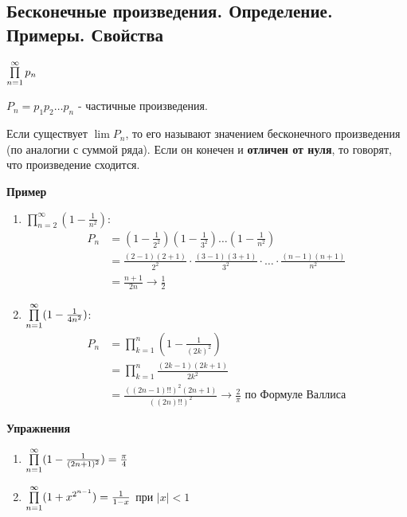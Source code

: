 \subsection{Бесконечные произведения. Определение. Примеры. Свойства }
\begin{conj}
    $\prod \limits_{n=1}^\infty p_n$

    $P_n = p_1p_2 \ldots p_n$ - частичные произведения.

    Если существует $\lim P_n$, то его называют значением бесконечного произведения (по аналогии с суммой ряда).
    Если он конечен и \textbf{отличен от нуля}, то говорят, что произведение сходится.
\end{conj}

\textbf{Пример}
\begin{enumerate}
    \item $\prod \limits_{n=2}^\infty (1 - \frac{1}{n^2})$:
    \begin{align*}
        P_n &= (1 - \frac{1}{2^2})(1-\frac{1}{3^2})\ldots (1-\frac{1}{n^2}) \\
        &= \frac{(2-1)(2+1)}{2^2}
        \cdot \frac{(3-1)(3+1)}{3^2} 
        \cdot \ldots \cdot \frac{(n-1)(n+1)}{n^2} \\
        &= \frac{n+1}{2n} \longrightarrow \frac{1}{2}
    \end{align*}
    \item $\prod \limits_{n=1}^\infty (1 - \frac{1}{4n^2})$:
    \begin{align*}
        P_n &= \prod \limits_{k=1}^n (1 - \frac{1}{(2k)^2}) \\
        &= \prod \limits_{k=1}^n \frac{(2k-1)(2k+1)}{2k^2} \\
        &= \frac{((2n-1)!!)^2(2n+1)}{((2n)!!)^2} \longrightarrow \frac{2}{\pi} \text{ по Формуле Валлиса}
    \end{align*}
\end{enumerate}
\textbf{Упражнения}
\begin{enumerate}
    \item $\prod \limits_{n=1}^\infty (1 - \frac{1}{(2n+1)^2}) = \frac{\pi}{4}$
    \item $\prod \limits_{n=1}^\infty (1+x^{2^{n-1}}) = \frac{1}{1-x}$ при $|x| < 1$
\end{enumerate}

